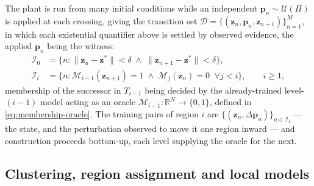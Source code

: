 The plant is run from many initial conditions while an independent
$\mathbf{p}_n\sim\mathcal{U}(\Pi)$ is applied at each crossing, giving the
transition set
$\mathcal{D}=\{(\mathbf{z}_n,\mathbf{p}_n,\mathbf{z}_{n+1})\}_{n=1}^{M}$, in
which each existential quantifier above is settled by observed evidence, the
applied $\mathbf{p}_n$ being the witness:
%
\begin{align}
\mathcal{I}_0&=\bigl\{n:\|\mathbf{z}_n-\mathbf{z}^{*}\|<\delta\;\wedge\;
\|\mathbf{z}_{n+1}-\mathbf{z}^{*}\|<\delta\bigr\},
\label{eq:index-T0}\\[2pt]
\mathcal{I}_i&=\bigl\{n:\mathcal{M}_{i-1}(\mathbf{z}_{n+1})=1\;\wedge\;
\mathcal{M}_{j}(\mathbf{z}_{n})=0\;\;\forall j<i\bigr\},
\qquad i\ge1,
\label{eq:index-Ti}
\end{align}
%
membership of the successor in $T_{i-1}$ being decided by the already-trained
level-$(i-1)$ model acting as an oracle
$\mathcal{M}_{i-1}:\mathbb{R}^{N}\to\{0,1\}$, defined in
\eqref{eq:membership-oracle}. The training pairs of region $i$ are
$\{(\mathbf{z}_n,\Delta\mathbf{p}_n)\}_{n\in\mathcal{I}_i}$ --- the state, and the
perturbation observed to move it one region inward --- and construction
proceeds bottom-up, each level supplying the oracle for the next.

\subsection{Clustering, region assignment and local models}
\label{subsec:ecr-clustering}

